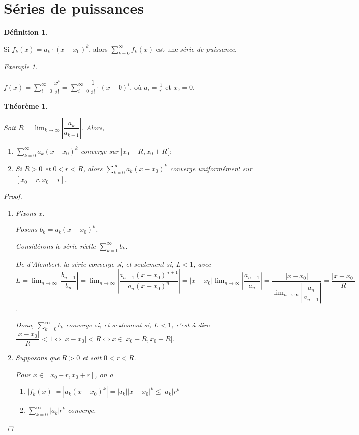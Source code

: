 \documentclass{report}
\newcommand*{\dsum}[4]{\displaystyle\sum_{#1=#2}^{#3}#4}
\newcommand*{\dlim}[3]{\displaystyle\lim_{#1 \to #2}#3}
\newcommand*{\abs}[1]{\left| #1 \right|}
\newcommand*{\lte}{\leqslant}
\newtheorem*{thm}{Th\'eor\`eme}
\theoremstyle{definition}
\newtheorem*{defin}{D\'efinition}
\theoremstyle{remark}
\newtheorem*{exem}{Exemple}
\begin{document}
	\section{S\'eries de puissances}
	\begin{defin}~

		Si $f_k(x) = a_k \cdot (x-x_0)^k$, alors $\dsum{k}{0}{\infty}{f_k(x)}$ est une \emph{s\'erie de puissance}.
	\end{defin}
	\begin{exem}~

		$f(x) = \dsum{i}{0}{\infty}{\dfrac{x^i}{i!}} = \dsum{i}{0}{\infty}{\dfrac{1}{i!} \cdot (x-0)^i}$, o\`u $a_i=\frac{1}{i!}$ et $x_0=0$.
	\end{exem}
	\begin{thm}~

		Soit $R = \dlim{k}{\infty}{\abs{\dfrac{a_k}{a_{k+1}}}}$. Alors,
		\begin{enumerate}[label=\alph*)]
			\item $\dsum{k}{0}{\infty}{a_k(x-x_0)^k}$ converge sur $]x_0-R, x_0+R[$;
			\item Si $R>0$ et $0<r<R$, alors $\dsum{k}{0}{\infty}{a_k(x-x_0)^k}$ converge uniform\'ement sur $[x_0-r, x_0+r]$.
		\end{enumerate}
		\begin{proof}~

			\begin{enumerate}[label=\alph*)]
				\item Fixons $x$.

				Posons $b_k = a_k(x-x_0)^k$.

				Consid\'erons la s\'erie r\'eelle $\dsum{k}{0}{\infty}{b_k}$.

				De d'Alembert, la s\'erie converge si, et seulement si, $L<1$, avec $L = \dlim{n}{\infty}{\abs{\dfrac{b_{n+1}}{b_n}}} = \dlim{n}{\infty}{\abs{\dfrac{a_{n+1}(x-x_0)^{n+1}}{a_n(x-x_0)^n}}} = \abs{x-x_0} \dlim{n}{\infty}{\abs{\dfrac{a_{n+1}}{a_n}}} = \dfrac{\abs{x-x_0}}{\dlim{n}{\infty}{\abs{\dfrac{a_n}{a_{n+1}}}}} = \dfrac{\abs{x-x_0}}{R}$.

				Donc, $\dsum{k}{0}{\infty}{b_k}$ converge si, et seulement si, $L<1$, c'est-\`a-dire $\dfrac{\abs{x-x_0}}{R}<1 \Leftrightarrow \abs{x-x_0} < R \Leftrightarrow x \in ]x_0-R, x_0+R[$.
				\item Supposons que $R>0$ et soit $0<r<R$.

				Pour $x \in [x_0-r, x_0+r]$, on a
				\begin{enumerate}[label=\roman*)]
					\item $\abs{f_k(x)} = \abs{a_k(x-x_0)^k} = \abs{a_k} \abs{x-x_0}^k \lte \abs{a_k} r^k$
					\item $\dsum{k}{0}{\infty}{\abs{a_k}r^k}$ converge.


\end{enumerate}
\end{enumerate}
\end{proof}
\end{thm}
\end{document}
